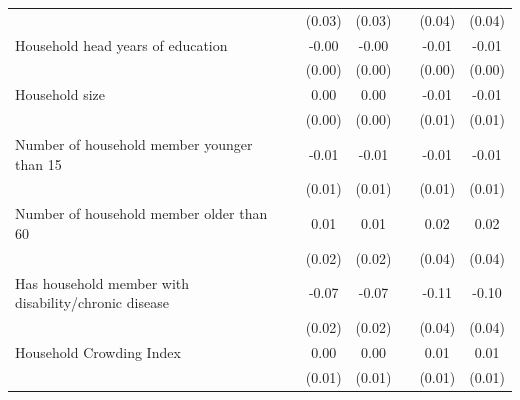 {\begin{tabular}{l*{6}{c}}
                    &                     &      (0.03)         &      (0.03)         &                     &      (0.04)         &      (0.04)         \\
Household head years of education&                     &       -0.00\sym{*}  &       -0.00\sym{*}  &                     &       -0.01         &       -0.01         \\
                    &                     &      (0.00)         &      (0.00)         &                     &      (0.00)         &      (0.00)         \\
Household size      &                     &        0.00         &        0.00         &                     &       -0.01         &       -0.01         \\
                    &                     &      (0.00)         &      (0.00)         &                     &      (0.01)         &      (0.01)         \\
Number of household member younger than 15&                     &       -0.01         &       -0.01         &                     &       -0.01         &       -0.01         \\
                    &                     &      (0.01)         &      (0.01)         &                     &      (0.01)         &      (0.01)         \\
Number of household member older than 60&                     &        0.01         &        0.01         &                     &        0.02         &        0.02         \\
                    &                     &      (0.02)         &      (0.02)         &                     &      (0.04)         &      (0.04)         \\
Has household member with disability/chronic disease&                     &       -0.07\sym{***}&       -0.07\sym{***}&                     &       -0.11\sym{**} &       -0.10\sym{**} \\
                    &                     &      (0.02)         &      (0.02)         &                     &      (0.04)         &      (0.04)         \\
Household Crowding Index&                     &        0.00         &        0.00         &                     &        0.01         &        0.01         \\
                    &                     &      (0.01)         &      (0.01)         &                     &      (0.01)         &      (0.01)         \\

\end{tabular}}
